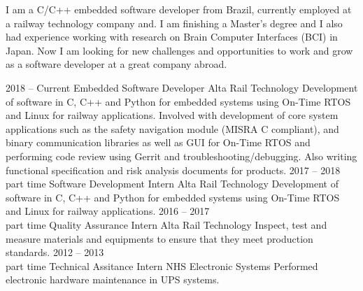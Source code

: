 \documentclass[9pt]{developercv} %
\begin{document}

\begin{minipage}[t]{0.4\textwidth} %
	\vspace{-\baselineskip} %
	I am a C/C++ embedded software developer from Brazil, currently employed at a railway
	technology company and. I am finishing a Master's degree and I also had experience working
	with research on Brain Computer Interfaces (BCI) in Japan. Now I am looking for new challenges 
	and opportunities to work and grow as a software developer at a great company abroad.
\end{minipage}
\hfill %
\begin{minipage}[t]{0.5\textwidth} %
	\vspace{-\baselineskip} %
	\begin{barchart}{5.5}
	\end{barchart}
\end{minipage}

\begin{center}
\end{center}



\begin{entrylist}
	\entry
		{2018 -- Current}
		{Embedded Software Developer}
		{Alta Rail Technology}
		{Development of software in C, C++ and Python for embedded systems using On-Time RTOS and
		Linux for railway applications. Involved with development of core system applications such
		as the safety navigation module (MISRA C compliant), and binary communication libraries as well 
		as GUI for On-Time RTOS and performing code review using Gerrit and troubleshooting/debugging.
		Also writing functional specification and risk analysis documents for products.}
	\entry
		{2017 -- 2018\\\footnotesize{part time}}
		{Software Development Intern}
		{Alta Rail Technology}
		{Development of software in C, C++ and Python for embedded systems using On-Time RTOS and 
		Linux for railway applications.}
	\entry
		{2016 -- 2017\\\footnotesize{part time}}
		{Quality Assurance Intern}
		{Alta Rail Technology}
		{Inspect, test and measure materials and equipments to ensure that they meet production standards.}
	\entry
		{2012 -- 2013\\\footnotesize{part time}}
		{Technical Assitance Intern}
		{NHS Electronic Systems}
		{Performed electronic hardware maintenance in UPS systems.}
\end{entrylist}
\end{document}
